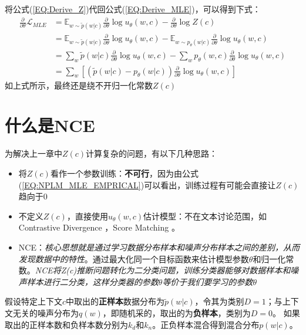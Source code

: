 \documentclass{article}
\begin{document}
将公式(\ref{EQ:Derive_Z})代回公式(\ref{EQ:Derive_MLE})，可以得到下式：
\begin{equation}
    \begin{split}
        \frac{\partial}{\partial \theta} \mathcal{L}_{MLE} &= \mathbb{E}_{w \sim \tilde{p}(w|c)} \frac{\partial}{\partial \theta} \log u_\theta(w,c) - \frac{\partial}{\partial \theta} \log Z(c) \\
        &= \mathbb{E}_{w \sim \tilde{p}(w|c)} \frac{\partial}{\partial \theta} \log u_\theta(w,c) - \mathbb{E}_{w \sim p_\theta(w|c)} \frac{\partial}{\partial \theta} \log u_\theta(w,c)\\
        &= \sum_{w} \tilde{p}(w|c) \frac{\partial}{\partial \theta} \log u_\theta (w,c) - \sum_{w} p_\theta (w,c)\frac{\partial}{\partial \theta} \log u_\theta (w,c) \\
        &= \sum_{w}[(\tilde{p}(w|c)-p_\theta(w|c))\frac{\partial}{\partial \theta} \log u_\theta (w,c)]
    \end{split}
    \label{EQ:NPLM_MLE_DERIVE}
\end{equation}
如上式所示，最终还是绕不开归一化常数$Z(c)$

\section{什么是NCE}
\label{sec:NCE}
为解决上一章中$Z(c)$计算复杂的问题，有以下几种思路：
\begin{itemize}
    \item 将$Z(c)$看作一个参数训练：\textbf{不可行}，因为由公式(\ref{EQ:NPLM_MLE_EMPRICAL})可以看出，训练过程有可能会直接让$Z(c)$趋向于0
    \item 不定义$Z(c)$，直接使用$u_\theta(w,c)$估计模型：不在文本讨论范围，如 Contrastive Divergence \cite{DBLP:journals/neco/Hinton02}，Score Matching \cite{DBLP:journals/jmlr/Hyvarinen05}。
    \item NCE：\emph{核心思想就是通过学习数据分布样本和噪声分布样本之间的差别，从而发现数据中的特性}。通过最大化同一个目标函数来估计模型参数$\theta$和归一化常数。\emph{NCE将Z(c)推断问题转化为二分类问题，训练分类器能够对数据样本和噪声样本进行二分类，这样分类器的参数$\theta$等价于我们要学习的参数$\theta$}
\end{itemize}

假设特定上下文$c$中取出的\textbf{正样本}数据分布为$\tilde{p}(w|c)$，令其为类别$D=1$；与上下文无关的噪声分布为$q(w)$，即随机采的，取出的为\textbf{负样本}，类别为$D=0$。
如果取出的正样本数和负样本数分别为$k_d$和$k_n$。正负样本混合得到混合分布$p(w|c)$。
\end{document}
